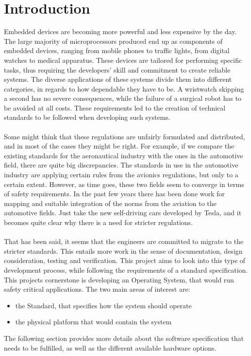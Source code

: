\chapter{Introduction}\label{ch:introduction} 

Embedded devices are becoming more powerful and less expensive by the day. The large majority of
microprocessors produced end up as components of embedded devices, ranging from mobile phones
to traffic lights, from digital watches to medical apparatus. These devices are tailored for 
performing specific tasks, thus requiring the developers' skill and commitment to create reliable
systems. The diverse applications of these systems divide them into different categories, in regards to
how dependable they have to be. A wristwatch skipping a second has no severe consequences, while the
failure of a surgical robot has to be avoided at all costs. These requirements led to the creation 
of technical standards to be followed when developing such systems. 
\\\\
Some might think that these regulations are unfairly formulated and distributed, and in most
of the cases they might be right. For example, if we compare the existing standards for the aeronautical industry with the ones in the automotive field, there are quite big discrepancies. The standards 
in use in the automotive industry are applying certain rules from the avionics regulations, 
but only to a certain extent.
However, as time goes, these two fields seem to converge in terms of safety requirements. 
In the past few years there has been done work for mapping and suitable integration 
of the norms from the aviation to the automotive fields. Just take the new self-driving 
cars developed by Tesla, and it becomes quite clear why there is a need for stricter regulations. 
\\\\
That has been said, it seems that the engineers are committed to migrate to the stricter standards. 
This entails more work in the sense of documentation, design consideration, testing and verification.
This project aims to look into this type of development process, while following the requirements 
of a standard specification.
This project\textquotesingle s cornerstone is developing an Operating System, that would run safety critical 
applications. The two main areas of interest are:
\begin{itemize}
\item the Standard, that specifies how the system should operate
\item the physical platform that would contain the system
\end{itemize}
The following section provides more details about the software specification that needs to be fulfilled,
as well as the different available hardware options.
